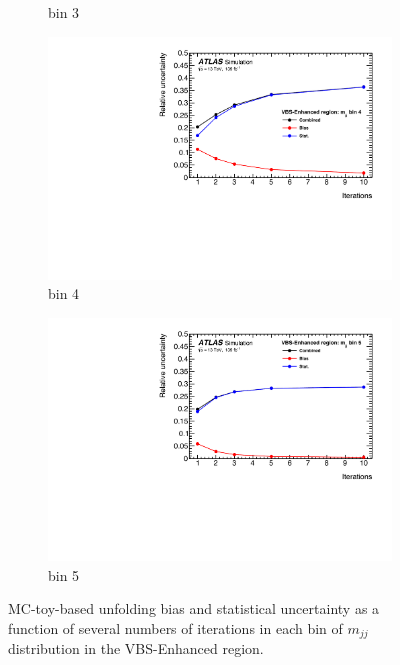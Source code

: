 \begin{figure}[htb]
\begin{subfigure}{.48\textwidth}
        \caption{ bin 3 }
    \end{subfigure}
    \begin{subfigure}{.48\textwidth}
        \centering
        \includegraphics[width=.9\linewidth]{figures/Analysis/Unfolding/unfolding_bias_stat_unc_mjj_VBSEnh_bin4.pdf}
        \caption{bin 4 }
    \end{subfigure}
    \begin{subfigure}{.48\textwidth}
        \centering
        \includegraphics[width=.9\linewidth]{figures/Analysis/Unfolding/unfolding_bias_stat_unc_mjj_VBSEnh_bin5.pdf}
        \caption{bin 5 }
    \end{subfigure}
    \caption{ MC-toy-based unfolding bias and statistical uncertainty as a function of several numbers of iterations in each bin of $m_{jj}$ distribution in the VBS-Enhanced region. \label{fig:UnfoldingBias_mjj_VBSEnhanced}}
\end{figure}

